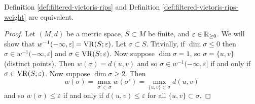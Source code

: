\begin{lemma} \label{lem:weight-definition-equivalent}
    Definition \ref{def:filtered-vietoris-rips} and Definition \ref{def:filtered-vietoris-rips-weight} are equivalent.
\end{lemma}

\begin{proof}
    Let $(M, d)$ be a metric space, $S \subset M$ be finite, and $\varepsilon \in \mathbb R_{\geq 0}$. We will show that $w^{-1}(-\infty, \varepsilon] = \operatorname{VR}(S;\varepsilon)$. Let $\sigma \subset S$. Trivially, if $\dim\sigma \leq 0$ then $\sigma \in w^{-1}(-\infty, \varepsilon]$ and $\sigma \in \operatorname{VR}(S;\varepsilon)$. Now suppose $\dim\sigma = 1$, so $\sigma = \{u, v\}$ (distinct points). Then $w(\sigma) = d(u,v)$ and so $\sigma \in w^{-1}(-\infty, \varepsilon]$ if and only if $\sigma \in \operatorname{VR}(S;\varepsilon)$. Now suppose $\dim\sigma \geq 2$. Then
    \[ w(\sigma) = \max_{\sigma' \subset \sigma} w(\sigma') = \max_{\{u, v\} \subset \sigma} d(u,v) \]
    and so $w(\sigma) \leq \varepsilon$ if and only if $d(u,v) \leq \varepsilon$ for all $\{u,v\} \subset \sigma$.
\end{proof}
